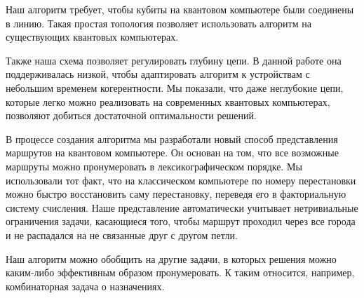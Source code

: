 Наш алгоритм требует, чтобы кубиты на квантовом компьютере были соединены в линию. Такая простая топология позволяет использовать алгоритм на существующих квантовых компьютерах. %

Также наша схема позволяет регулировать глубину цепи.
В данной работе она поддерживалась низкой, чтобы адаптировать алгоритм к устройствам с небольшим временем когерентности. 
Мы показали, что даже неглубокие цепи, которые легко можно реализовать на современных квантовых компьютерах, позволяют добиться достаточной оптимальности решений.

В процессе создания алгоритма мы разработали новый способ представления маршрутов на квантовом компьютере.
Он основан на том, что все возможные маршруты можно пронумеровать в лексикографическом порядке.
Мы использовали тот факт, что на классическом компьютере по номеру перестановки можно быстро восстановить саму перестановку, переведя его в факториальную систему счисления.
Наше представление автоматически учитывает нетривиальные ограничения задачи, касающиеся того, чтобы маршрут проходил через все города и не распадался на не связанные друг с другом петли.

Наш алгоритм можно обобщить на другие задачи, в которых решения можно каким-либо эффективным образом пронумеровать. К таким относится, например, комбинаторная задача о назначениях.








\sloppy
\showbib


 

